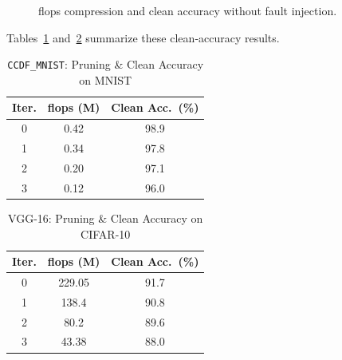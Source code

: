 \begin{figure}[H]
  \centering
  \quad
  \caption{\gls{flops} compression and clean accuracy without fault injection.}
  \label{fig:baseline_results}
\end{figure}

Tables~\ref{tab:ccdf_clean} and~\ref{tab:vgg_clean} summarize these clean‐accuracy results.

\begin{table}[H]
  \centering
  \caption{\texttt{CCDF\_MNIST}: Pruning \& Clean Accuracy on MNIST}
  \label{tab:ccdf_clean}
  \begin{tabular}{c|c|c}
    \toprule
    \textbf{Iter.} & \textbf{\gls{flops} (M)} & \textbf{Clean Acc.\ (\%)} \\
    \midrule
    0 & 0.42 & 98.9 \\
    1 & 0.34 & 97.8 \\
    2 & 0.20 & 97.1 \\
    3 & 0.12 & 96.0 \\
    \bottomrule
  \end{tabular}
\end{table}

\begin{table}[H]
  \centering
  \caption{VGG-16: Pruning \& Clean Accuracy on CIFAR-10}
  \label{tab:vgg_clean}
  \begin{tabular}{c|c|c}
    \toprule
    \textbf{Iter.} & \textbf{\gls{flops} (M)} & \textbf{Clean Acc.\ (\%)} \\
    \midrule
    0 & 229.05& 91.7\\
    1 &  138.4 & 90.8\\
    2 &  80.2  & 89.6 \\
    3 &  43.38 & 88.0\\
    \bottomrule
  \end{tabular}
\end{table}

